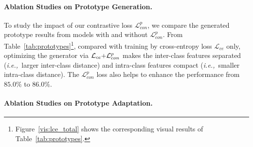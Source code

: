 \documentclass{article}
\def\ie{\emph{i.e.,~}}
\def\mata{\textcolor{black}}
\begin{document}
\paragraph{Ablation Studies on Prototype Generation.}


\begin{table}[t]
\vspace{-0.01in}
\renewcommand\arraystretch{1.4}
\setlength\tabcolsep{4pt}
    \begin{center}
\end{center}
    \vspace{-0.1in}
    \caption{\label{tab:prototypes}Ablation studies on prototype generation in the stage one with different losses. Inter-class distance and intra-class distance is based on cosine distance (range from 0 to 2). \mata{We report per-class accuracy (\%) after training the model on \textbf{VisDA} for 400 epochs}.}
\end{table}

To study the impact of our contrastive loss $\mathcal{L}_{con}^p$, we compare the generated prototype results from models with and without $\mathcal{L}_{con}^p$.
From Table~\ref{tab:prototypes}\footnote{Figure~\ref{vis:lce_total} shows the corresponding visual results of Table~\ref{tab:prototypes}.}, compared with training by cross-entropy loss $\mathcal{L}_{ce}$ only, optimizing the generator via $\mathcal{L}_{ce} \small{+} \mathcal{L}_{con}^{p}$ makes the inter-class features separated (\ie larger inter-class distance) and intra-class features compact (\ie smaller intra-class distance).
The $\mathcal{L}_{con}^p$ loss also helps to enhance the performance from $85.0\%$ to $86.0\%$.





\paragraph{Ablation Studies on Prototype Adaptation.}
\end{document}
